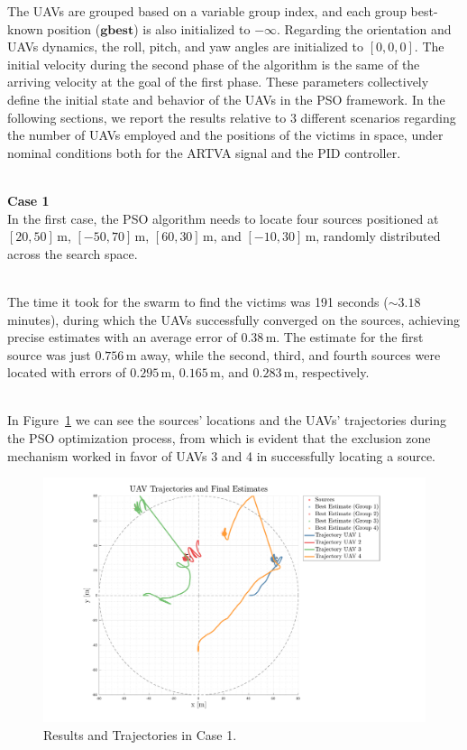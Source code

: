 \documentclass[main]{subfiles}
\begin{document}
The UAVs are grouped based on a variable group index, and 
each group best-known position ($\mathbf{gbest}$) is also 
initialized to \(-\infty\).
Regarding the orientation and UAVs dynamics, the roll, pitch, and yaw angles
are initialized to \([0, 0, 0]\).
The initial velocity during the second phase of the algorithm is the same
of the arriving velocity at the goal of the first phase.
These parameters collectively define the initial state and behavior of the 
UAVs in the PSO framework.
In the following sections, we report the results relative to 3 different 
scenarios regarding the number of UAVs employed and the positions of the victims
in space, under nominal conditions both for the ARTVA signal and the PID controller.

\noindent\\
\textbf{Case 1}\\
In the first case, the PSO algorithm needs to locate four sources positioned 
at \([20, 50] \, \text{m}\), \([-50, 70] \, \text{m}\), \([60, 30] \, \text{m}\), 
and \([-10, 30] \, \text{m}\), 
randomly distributed across the search space.

\noindent\\
The time it took for the swarm to find the victims was 191 seconds (\(\sim 3.18\) minutes),
during which the UAVs successfully converged on the sources, 
achieving precise estimates with an average error of \(0.38 \, \text{m}\). The estimate for the first source was 
just \(0.756 \, \text{m}\) away, while the second, third, and fourth sources were 
located with errors of \(0.295 \, \text{m}\), \(0.165 \, \text{m}\), and \(0.283 \, \text{m}\), respectively.

\noindent\\
In Figure~\ref{fig:case1} we can see  
the sources' locations and the UAVs' trajectories during the PSO 
optimization process, from which is evident that the exclusion zone mechanism
worked in favor of UAVs 3 and 4 in successfully locating a source.

\begin{figure}
    \centering
    \includegraphics[width=1.06\textwidth]{images/case_1.pdf}
    \caption[PSO Case 1]{Results and Trajectories in Case 1.}
    \label{fig:case1}
\end{figure}
\end{document}
